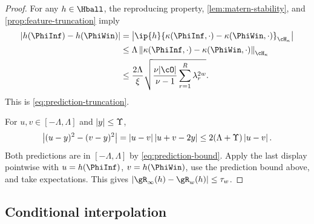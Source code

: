 \begin{proof}
For any \(h\in\Hball\), the reproducing property,
\cref{lem:matern-stability}, and \cref{prop:feature-truncation} imply
\begin{align*}
    \abs{h(\PhiInf)-h(\PhiWin)}
    &=
    \abs{
      \ip{h}{
        \kappa(\PhiInf,\cdot)-\kappa(\PhiWin,\cdot)
      }_{\cH_\kappa}
    }\\
    &\leq
    \Lambda
    \norm{
      \kappa(\PhiInf,\cdot)-\kappa(\PhiWin,\cdot)
    }_{\cH_\kappa}\\
    &\leq
    \frac{2\Lambda}{\xi}
    \sqrt{
      \frac{\nu|\cO|}{\nu-1}
      \sum_{r=1}^R\lambda_r^{2w}
    }.
\end{align*}
This is \cref{eq:prediction-truncation}.

For \(u,v\in[-\Lambda,\Lambda]\) and \(\left| y \right|\leq\Upsilon\),
\[
    \left| (u-y)^2-(v-y)^2 \right|
    =
    \left| u-v \right|\left| u+v-2y \right|
    \leq2(\Lambda+\Upsilon)\left| u-v \right|.
\]
Both predictions are in \([-\Lambda,\Lambda]\) by
\cref{eq:prediction-bound}. Apply the last display pointwise with
\(u=h(\PhiInf)\), \(v=h(\PhiWin)\), use the prediction bound above, and take
expectations. This gives
\(\abs{\risk_\infty(h)-\risk_w(h)}\leq\tau_w\).
\end{proof}

\subsection{Conditional interpolation}

